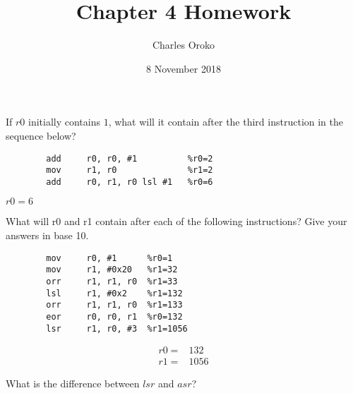 \documentclass[12pt]{article}
\newenvironment{problem}[2][Problem]{\begin{trivlist}
\item[\hskip \labelsep {\bfseries #1}\hskip \labelsep {\bfseries #2.}]}{\end{trivlist}}
\begin{document}
 
 
\title{Chapter 4 Homework}%
\author{Charles Oroko} %
\date{8 November 2018}
\maketitle


\begin{problem}{4.1}
    If $r0$ initially contains $1$, what will it contain after the third instruction in the sequence below?
    \begin{verbatim}
        add     r0, r0, #1          %r0=2
        mov     r1, r0              %r1=2
        add     r0, r1, r0 lsl #1   %r0=6
    \end{verbatim}

\end{problem}

$r0=6$


\begin{problem}{4.2}
    What will r0 and r1 contain after each of the following instructions? Give your answers in base 10.
    \begin{verbatim}
        mov     r0, #1      %r0=1
        mov     r1, #0x20   %r1=32
        orr     r1, r1, r0  %r1=33
        lsl     r1, #0x2    %r1=132
        orr     r1, r1, r0  %r1=133
        eor     r0, r0, r1  %r0=132
        lsr     r1, r0, #3  %r1=1056
    \end{verbatim}

\end{problem}

\begin{align*}
    r0 = & 132 \\
    r1 = & 1056
\end{align*}


\begin{problem}{4.3}
    What is the difference between $lsr$ and $asr$?
\end{problem}
\end{document}
